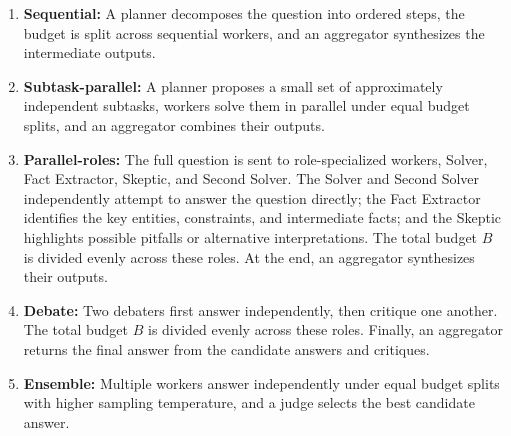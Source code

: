 \documentclass{article} %
\begin{document}


\begin{enumerate}
    \item \textbf{Sequential:} A planner decomposes the question into ordered steps, the budget is split across sequential workers, and an aggregator synthesizes the intermediate outputs.

    \item \textbf{Subtask-parallel:} A planner proposes a small set of approximately independent subtasks, workers solve them in parallel under equal budget splits, and an aggregator combines their outputs.

    \item \textbf{Parallel-roles:} The full question is sent to role-specialized workers, Solver, Fact Extractor, Skeptic, and Second Solver. The Solver and Second Solver independently attempt to answer the question directly; the Fact Extractor identifies the key entities, constraints, and intermediate facts; and the Skeptic highlights possible pitfalls or alternative interpretations. The total budget \(B\) is divided evenly across these roles. At the end, an aggregator synthesizes their outputs.

    \item \textbf{Debate:} Two debaters first answer independently, then critique one another. The total budget \(B\) is divided evenly across these roles. Finally, an aggregator returns the final answer from the candidate answers and critiques.

    \item \textbf{Ensemble:} Multiple workers answer independently under equal budget splits with higher sampling temperature, and a judge selects the best candidate answer.
\end{enumerate}
\end{document}
